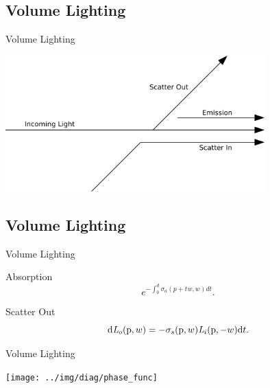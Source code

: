 \documentclass[compress,professionalfont]{beamer}
\begin{document}
\subsection{Volume Lighting}
\begin{frame}{Volume Lighting}

    \centering
    \vspace{0cm}
    \includegraphics[width=100mm]{../img/diag/vol_scatter.pdf}

\end{frame}




\subsection{Volume Lighting}
\begin{frame}{Volume Lighting}

    \begin{block}{Absorption}
        \[
            e^{-\int_{0}^{d}\sigma_{a} (p+t\mathit{w},\mathit{w})d\mathit{t}}.
        \]
    \end{block}

    \begin{block}{Scatter Out}
        \[
            \textup{d}\mathit{L}_{o}(\textup{p},w) = -\sigma_{s}(\textup{p},w) \mathit{L}_{i}(\textup{p},-w)\textup{d}t.
        \]
    \end{block}

\end{frame}




\begin{frame}{Volume Lighting}

    \centering
    \texttt{[image: ../img/diag/phase\_func]}

\end{frame}
\end{document}

